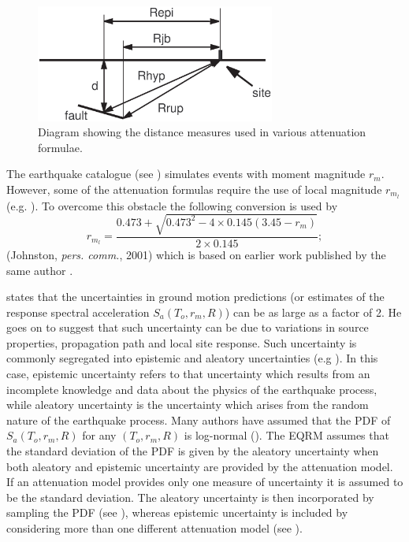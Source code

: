 \begin{figure}[htp]
 \centering {}
 
  
\includegraphics[width=0.7\textwidth]{diags/fig-hattn-distance}
\caption{Diagram showing the distance measures used in various
  attenuation formulae.}
  \label{fig:attn-distances}
\end{figure}

The earthquake catalogue (see ) simulates events
with moment magnitude $r_m$. However, some of the attenuation
formulas require the use of local magnitude $r_{m_l}$ (e.g.
\citealt{dr_Gaull90a}). To overcome this obstacle the following
conversion is used by 
\begin{equation}
r_{m_l} =
\frac{0.473+\sqrt{0.473^2-4\times0.145(3.45-r_m)}}{2\times0.145};
\end{equation}
(Johnston, \textit{pers. comm.}, 2001) which is based on earlier
work published by the same author \citep{dr_Johnstone96a}.

\citet{dr_Boore83a} states that the uncertainties in ground motion
predictions (or estimates of the response spectral
acceleration
$S_a(T_o,r_m,R)$) can be as large as a factor of 2. He goes on to
suggest that such uncertainty can be due to variations in source
properties, propagation path and local site response. Such
uncertainty is commonly segregated into epistemic and aleatory
uncertainties (e.g \citealt{dr_Toro97a}). In this case, epistemic
uncertainty refers to that uncertainty which results from an
incomplete knowledge and data about the physics of the earthquake
process, while aleatory uncertainty is the uncertainty which
arises from the random nature of the earthquake process. Many
authors have assumed that the PDF of $S_a(T_o,r_m,R)$ for any
$(T_o,r_m,R)$ is log-normal (\citealp{dr_Campbell03a}). The EQRM
assumes that the standard deviation of the PDF is given by the
aleatory uncertainty when both aleatory and epistemic uncertainty
are provided by the attenuation model. If an attenuation model
provides only one measure of uncertainty it is assumed to be the
standard deviation. The aleatory uncertainty is then incorporated
by sampling the PDF (see ), whereas
epistemic uncertainty is included by considering more than one
different attenuation model (see
).


